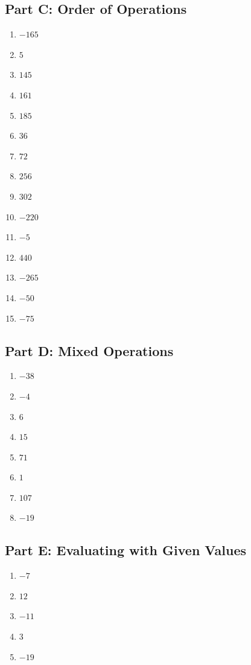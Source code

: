 \documentclass[11pt]{article}
\begin{document}
\subsection*{Part C: Order of Operations}
\begin{multicols}{3}
\begin{enumerate}
  \item $-165$
  \item $5$
  \item $145$
  \item $161$
  \item $185$
  \item $36$
  \item $72$
  \item $256$
  \item $302$
  \item $-220$
  \item $-5$
  \item $440$
  \item $-265$
  \item $-50$
  \item $-75$
\end{enumerate}
\end{multicols}
\subsection*{Part D: Mixed Operations}
\begin{multicols}{3}
\begin{enumerate}
  \item $-38$
  \item $-4$
  \item $6$
  \item $15$
  \item $71$
  \item $1$
  \item $107$
  \item $-19$
\end{enumerate}
\end{multicols}
\subsection*{Part E: Evaluating with Given Values}
\begin{multicols}{3}
\begin{enumerate}
  \item $-7$
  \item $12$
  \item $-11$
  \item $3$
  \item $-19$
\end{enumerate}
\end{multicols}
\end{document}
